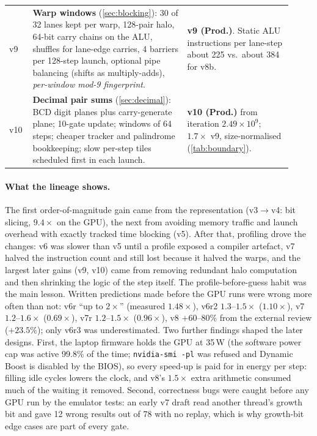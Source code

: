 \documentclass[11pt,a4paper]{article}
\newcommand{\code}[1]{\texttt{\small #1}}
\theoremstyle{remark}
\begin{document}
\begin{longtable}{@{}p{0.075\linewidth}p{0.50\linewidth}p{0.34\linewidth}@{}}
v9 & \textbf{Warp windows} (\cref{sec:blocking}): 30 of 32 lanes kept per warp, 128-pair halo, 64-bit carry chains on the ALU, shuffles for lane-edge carries, 4 barriers per 128-step launch, optional pipe balancing (shifts as multiply-adds), \emph{per-window mod-9 fingerprint}. & \textbf{v9 (Prod.)}. Static ALU instructions per lane-step about 225 vs.\ about 384 for v8b.\\
v10 & \textbf{Decimal pair sums} (\cref{sec:decimal}): BCD digit planes plus carry-generate plane; 10-gate update; windows of 64 steps; cheaper tracker and palindrome bookkeeping; slow per-step tiles scheduled first in each launch. & \textbf{v10 (Prod.)} from iteration $2.49\times10^9$; $1.7\times$ v9, size-normalised (\cref{tab:boundary}).\\
\end{longtable}
\endgroup

\paragraph{What the lineage shows.}
The first order-of-magnitude gain came from the representation (v3$\to$v4: bit slicing, $9.4\times$ on the GPU), the next from avoiding memory traffic and launch overhead with exactly tracked time blocking (v5). After that, profiling drove the changes: v6 was slower than v5 until a profile exposed a compiler artefact, v7 halved the instruction count and still lost because it halved the warps, and the largest later gains (v9, v10) came from removing redundant halo computation and then shrinking the logic of the step itself. The profile-before-guess habit was the main lesson. Written predictions made before the GPU runs were wrong more often than not: v6r ``up to $2\times$'' (measured $1.48\times$), v6r2 $1.3$--$1.5\times$ ($1.10\times$), v7 $1.2$--$1.6\times$ ($0.69\times$), v7r $1.2$--$1.5\times$ ($0.96\times$), v8 $+60$--$80\%$ from the external review ($+23.5\%$); only v6r3 was underestimated. Two further findings shaped the later designs. First, the laptop firmware holds the GPU at 35\,W (the software power cap was active 99.8\% of the time; \code{nvidia-smi -pl} was refused and Dynamic Boost is disabled by the BIOS), so every speed-up is paid for in energy per step: filling idle cycles lowers the clock, and v8's $1.5\times$ extra arithmetic consumed much of the waiting it removed. Second, correctness bugs were caught before any GPU run by the emulator tests: an early v7 draft read another thread's growth bit and gave 12 wrong results out of 78 with no replay, which is why growth-bit edge cases are part of every gate.
\end{document}
